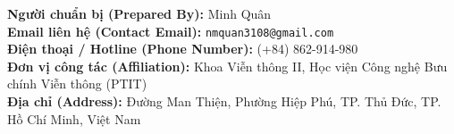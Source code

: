 \documentclass[11pt,a4paper]{article}
\begin{document}
\vspace{0.3cm}
\noindent
\begin{minipage}{0.95\textwidth}
    \textbf{Người chuẩn bị (Prepared By):} Minh Quân\\
    \textbf{Email liên hệ (Contact Email):} \texttt{nmquan3108@gmail.com}\\
    \textbf{Điện thoại / Hotline (Phone Number):} (+84) 862-914-980\\
    \textbf{Đơn vị công tác (Affiliation):} Khoa Viễn thông II, Học viện Công nghệ Bưu chính Viễn thông (PTIT)\\
    \textbf{Địa chỉ (Address):} Đường Man Thiện, Phường Hiệp Phú, TP. Thủ Đức, TP. Hồ Chí Minh, Việt Nam
\end{minipage}

\vspace{0.6cm}
\nocite{*}


\end{document}
